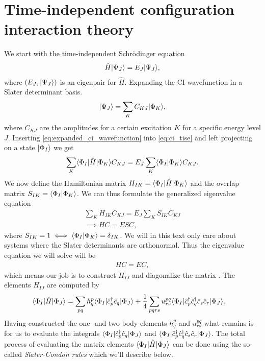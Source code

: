     \section{Time-independent configuration interaction theory}
        We start with the time-independent Schrödinger equation
        \begin{align}
            \hat{H}| \Psi_J \rangle = E_J| \Psi_J \rangle,
            \label{eq:ci_tise}
        \end{align}
        where $(E_J, | \Psi_J \rangle)$ is an eigenpair for $\hat{H}$. Expanding the
        CI wavefunction in a Slater determinant basis.
        \begin{align}
            | \Psi_J \rangle = \sum_{K} C_{KJ}| \Phi_K \rangle,
            \label{eq:expanded_ci_wavefunction}
        \end{align}
        where $C_{KJ}$ are the amplitudes for a certain excitation $K$ for a
        specific energy level $J$. Inserting
        \autoref{eq:expanded_ci_wavefunction} into \autoref{eq:ci_tise} and left
        projecting on a state $| \Phi_I \rangle$ we get
        \begin{align}
            \sum_{K}\langle \Phi_I |\hat{H}| \Phi_K \rangle C_{KJ}
            = E_J\sum_{K}\langle \Phi_I | \Phi_K \rangle C_{KJ}.
        \end{align}
        We now define the Hamiltonian matrix $H_{IK} =
        \langle \Phi_I |\hat{H}| \Phi_K \rangle$ and the overlap matrix $S_{IK} =
        \langle \Phi_I | \Phi_K \rangle$. We can thus formulate the generalized
        eigenvalue equation
        \begin{gather}
            \sum_{K}H_{IK}C_{KJ} = E_J\sum_{K}S_{IK}C_{KJ}
            \\
            \implies
            HC = ESC,
        \end{gather}
        where $S_{IK} = 1 \iff \langle \Phi_I | \Phi_K \rangle = \delta_{IK}$. We will
        in this text only care about systems where the Slater determinants are
        orthonormal. Thus the eigenvalue equation we will solve will be
        \begin{align}
            HC = EC,
        \end{align}
        which means our job is to construct $H_{IJ}$ and diagonalize the
        matrix \cite{karwowski}. The elements $H_{IJ}$ are computed by
        \begin{align}
            \langle \Phi_I |\hat{H}| \Phi_J \rangle
            &= \sum_{pq}h^{p}_{q}
            \langle \Phi_I |\hat{c}_{p}^{\dagger}\hat{c}_{q}| \Phi_J \rangle
            + \frac{1}{4}\sum_{pqrs}u^{pq}_{rs}
            \langle \Phi_I |\hat{c}_{p}^{\dagger}\hat{c}_{q}^{\dagger}\hat{c}_{s}\hat{c}_{r}| \Phi_J \rangle.
        \end{align}
        Having constructed the one- and two-body elements $h^{p}_{q}$ and
        $u^{pq}_{rs}$ what remains is for us to evaluate the integrals
        $\langle \Phi_I |\hat{c}_{p}^{\dagger}\hat{c}_{q}| \Phi_J \rangle$ and
        $\langle \Phi_I |\hat{c}_{p}^{\dagger}\hat{c}_{q}^{\dagger}\hat{c}_{s}\hat{c}_{r}| \Phi_J \rangle$. The total
        process of evaluating the matrix elements
        $\langle \Phi_I |\hat{H}| \Phi_J \rangle$ can be done using the so-called
        \emph{Slater-Condon rules} which we'll describe below.

